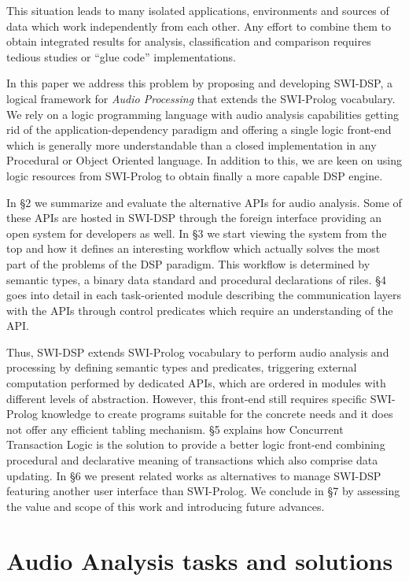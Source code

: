 \documentclass{llncs}
\begin{document}
This situation leads to many isolated applications, environments and sources of data which work independently from each other. Any effort to combine them to obtain integrated results for analysis, classification and comparison requires tedious studies or ``glue code'' implementations.

In this paper we address this problem by proposing and developing SWI-DSP, a logical framework for \textit{Audio Processing} that extends the SWI-Prolog vocabulary. We rely on a logic programming language with audio analysis capabilities getting rid of the application-dependency paradigm and offering a single logic front-end which is generally more understandable than a closed implementation in any Procedural or Object Oriented language. In addition to this, we are keen on using logic resources from SWI-Prolog to obtain finally a more capable DSP engine.

In \S 2 we summarize and evaluate the alternative APIs for audio analysis. Some of these APIs are hosted in SWI-DSP through the foreign interface providing an open system for developers as well. In \S 3 we start viewing the system from the top and how it defines an interesting workflow which actually solves the most part of the problems of the DSP paradigm. This workflow is determined by semantic types, a binary data standard and procedural declarations of riles. \S4 goes into detail in each task-oriented module describing the communication layers with the APIs through control predicates which require an understanding of the API.

Thus, SWI-DSP extends SWI-Prolog vocabulary to perform audio analysis and processing by defining semantic types and predicates, triggering external computation performed by dedicated APIs, which are ordered in modules with different levels of abstraction. However, this front-end still requires specific SWI-Prolog knowledge to create programs suitable for the concrete needs and it does not offer any efficient tabling mechanism. \S 5 explains how Concurrent Transaction Logic is the solution to provide a better logic front-end combining procedural and declarative meaning of transactions which also comprise data updating. In \S 6 we present related works as alternatives to manage SWI-DSP featuring another user interface than SWI-Prolog. We conclude in \S 7 by assessing the value and scope of this work and introducing future advances.

\section{Audio Analysis tasks and solutions}
\end{document}
